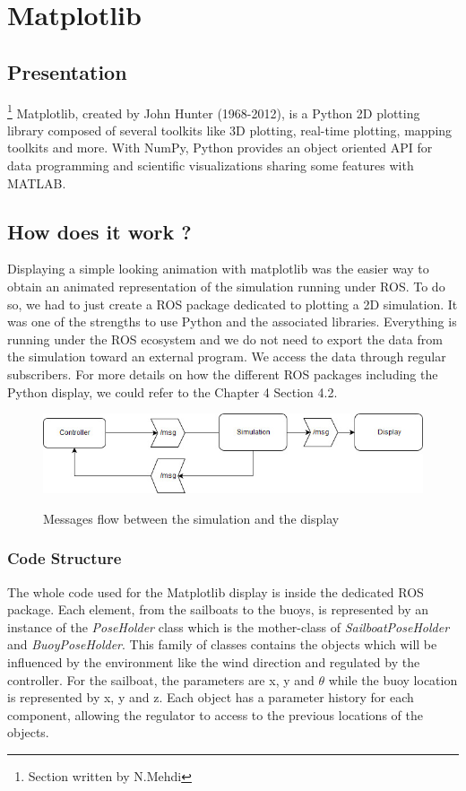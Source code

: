 \documentclass[a4paper]{report}
\begin{document}
\section{Matplotlib}

\subsection{Presentation}
\footnote{Section written by N.Mehdi } 
Matplotlib, created by John Hunter (1968-2012), is a Python 2D plotting library composed of several toolkits like 3D plotting, real-time plotting, mapping toolkits and more. With NumPy, Python provides an object oriented API for data programming and scientific visualizations sharing some features with MATLAB.

\subsection{How does it work ?}

Displaying a simple looking animation with matplotlib was the easier way to obtain an animated representation of the simulation running under ROS. To do so, we had to just create a ROS package dedicated to plotting a 2D simulation. It was one of the strengths to use Python and the associated libraries. Everything is running under the ROS ecosystem and we do not need to export the data from the simulation toward an external program. We access the data through regular subscribers.
For more details on how the different ROS packages including the Python display, we could refer to the Chapter 4 Section 4.2. 

\begin{figure}[H]
  \centering
  \includegraphics[scale = 0.6]{image/index.jpg}
  \label{Flow}
  \caption{Messages flow between the simulation and the display }
\end{figure}

\subsubsection{Code Structure}

The whole code used for the Matplotlib display is inside the dedicated ROS package. Each element, from the sailboats to the buoys, is represented by an instance of the \textit{PoseHolder} class which is the mother-class of \textit{SailboatPoseHolder} and \textit{BuoyPoseHolder}. This family of classes contains the objects which will be influenced by the environment like the wind direction and regulated by the controller. For the sailboat, the parameters are x, y and $\theta$ while the buoy location is represented by x, y and z. Each object has a parameter history for each component, allowing the regulator to access to the previous locations  of the objects. 
\end{document}
